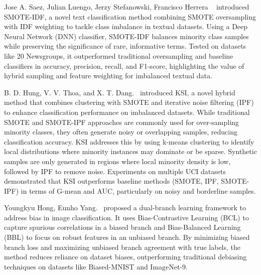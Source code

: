 \documentclass[conference]{IEEEtran}
\begin{document}
Jose A. Saez, Julian Luengo, Jerzy Stefanowski, Francisco Herrera ~\cite{b2} introduced SMOTE-IDF, a novel text classification method combining SMOTE oversampling with IDF weighting to tackle class imbalance in textual datasets. Using a Deep Neural Network (DNN) classifier, SMOTE-IDF balances minority class samples while preserving the significance of rare, informative terms. Tested on datasets like 20 Newsgroups, it outperformed traditional oversampling and baseline classifiers in accuracy, precision, recall, and F1-score, highlighting the value of hybrid sampling and feature weighting for imbalanced textual data.


B. D. Hung, V. V. Thoa, and X. T. Dang.~\cite{b4} introduced KSI, a novel hybrid method that combines clustering with SMOTE and iterative noise filtering (IPF) to enhance classification performance on imbalanced datasets. While traditional SMOTE and SMOTE-IPF approaches are commonly used for over-sampling minority classes, they often generate noisy or overlapping samples, reducing classification accuracy. KSI addresses this by using k-means clustering to identify local distributions where minority instances may dominate or be sparse. Synthetic samples are only generated in regions where local minority density is low, followed by IPF to remove noise. Experiments on multiple UCI datasets demonstrated that KSI outperforms baseline methods (SMOTE, IPF, SMOTE-IPF) in terms of G-mean and AUC, particularly on noisy and borderline samples.

Youngkyu Hong, Eunho Yang.~\cite{b5} proposed a dual-branch learning framework to address bias in image classification. It uses Bias-Contrastive Learning (BCL) to capture spurious correlations in a biased branch and Bias-Balanced Learning (BBL) to focus on robust features in an unbiased branch. By minimizing biased branch loss and maximizing unbiased branch agreement with true labels, the method reduces reliance on dataset biases, outperforming traditional debiasing techniques on datasets like Biased-MNIST and ImageNet-9.
\end{document}
